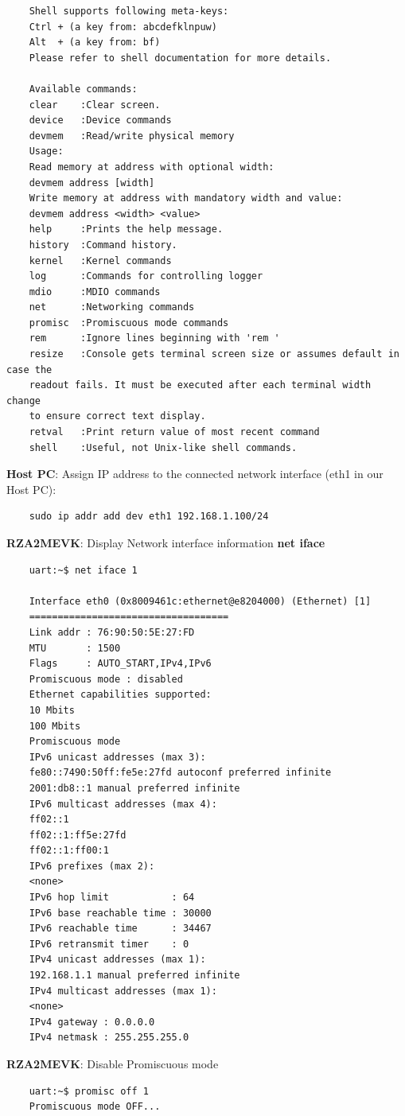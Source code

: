 \documentclass[11pt,a4paper,oneside]{article}
\begin{document}
\begin{lstlisting}
	Shell supports following meta-keys:
	Ctrl + (a key from: abcdefklnpuw)
	Alt  + (a key from: bf)
	Please refer to shell documentation for more details.

	Available commands:
	clear    :Clear screen.
	device   :Device commands
	devmem   :Read/write physical memory
	Usage:
	Read memory at address with optional width:
	devmem address [width]
	Write memory at address with mandatory width and value:
	devmem address <width> <value>
	help     :Prints the help message.
	history  :Command history.
	kernel   :Kernel commands
	log      :Commands for controlling logger
	mdio     :MDIO commands
	net      :Networking commands
	promisc  :Promiscuous mode commands
	rem      :Ignore lines beginning with 'rem '
	resize   :Console gets terminal screen size or assumes default in case the
	readout fails. It must be executed after each terminal width change
	to ensure correct text display.
	retval   :Print return value of most recent command
	shell    :Useful, not Unix-like shell commands.
\end{lstlisting}

\textbf{Host PC}: Assign IP address to the connected network interface (eth1 in our Host PC):
\begin{lstlisting}
	sudo ip addr add dev eth1 192.168.1.100/24
\end{lstlisting}

\textbf{RZA2MEVK}: Display Network interface information \textbf{net iface}
\begin{lstlisting}
	uart:~$ net iface 1

	Interface eth0 (0x8009461c:ethernet@e8204000) (Ethernet) [1]
	===================================
	Link addr : 76:90:50:5E:27:FD
	MTU       : 1500
	Flags     : AUTO_START,IPv4,IPv6
	Promiscuous mode : disabled
	Ethernet capabilities supported:
	10 Mbits
	100 Mbits
	Promiscuous mode
	IPv6 unicast addresses (max 3):
	fe80::7490:50ff:fe5e:27fd autoconf preferred infinite
	2001:db8::1 manual preferred infinite
	IPv6 multicast addresses (max 4):
	ff02::1
	ff02::1:ff5e:27fd
	ff02::1:ff00:1
	IPv6 prefixes (max 2):
	<none>
	IPv6 hop limit           : 64
	IPv6 base reachable time : 30000
	IPv6 reachable time      : 34467
	IPv6 retransmit timer    : 0
	IPv4 unicast addresses (max 1):
	192.168.1.1 manual preferred infinite
	IPv4 multicast addresses (max 1):
	<none>
	IPv4 gateway : 0.0.0.0
	IPv4 netmask : 255.255.255.0
\end{lstlisting}

\textbf{RZA2MEVK}: Disable Promiscuous mode
\begin{lstlisting}
	uart:~$ promisc off 1
	Promiscuous mode OFF...
\end{lstlisting}
\end{document}

